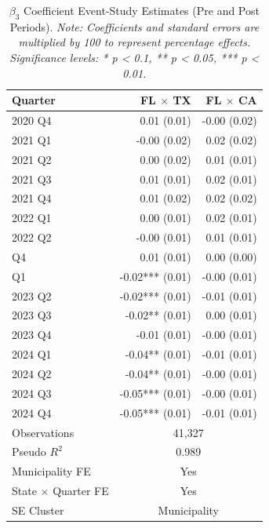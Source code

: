 {\renewcommand{\arraystretch}{1.25}
\setlength{\tabcolsep}{22pt}
\begin{table}

\caption{$\beta_3$ Coefficient Event-Study Estimates (Pre and Post Periods). \textit{Note: Coefficients and standard errors are multiplied by 100 to represent percentage effects. Significance levels: * p < 0.1, ** p < 0.05, *** p < 0.01.} \label{tab:spillovers_tx_ca}}
\centering
\begin{tabular}[t]{lrr}
\toprule
Quarter & FL $\times$ TX & FL $\times$ CA\\
\midrule
2020 Q4 & 0.01\phantom{***} (0.01) & -0.00\phantom{***} (0.02)\\
2021 Q1 & -0.00\phantom{***} (0.02) & 0.02\phantom{***} (0.02)\\
2021 Q2 & 0.00\phantom{***} (0.02) & 0.01\phantom{***} (0.01)\\
2021 Q3 & 0.01\phantom{***} (0.01) & 0.02\phantom{***} (0.01)\\
2021 Q4 & 0.01\phantom{***} (0.02) & 0.02\phantom{***} (0.02)\\
2022 Q1 & 0.00\phantom{***} (0.01) & 0.02\phantom{***} (0.01)\\
2022 Q2 & -0.00\phantom{***} (0.01) & 0.01\phantom{***} (0.01)\\
\addlinespace
2022 Q4 & 0.01\phantom{***} (0.01) & 0.00\phantom{***} (0.00)\\
\addlinespace
2023 Q1 & -0.02*** (0.01) & -0.00\phantom{***} (0.01)\\
2023 Q2 & -0.02*** (0.01) & -0.01\phantom{***} (0.01)\\
2023 Q3 & -0.02**\phantom{*} (0.01) & 0.00\phantom{***} (0.01)\\
2023 Q4 & -0.01\phantom{***} (0.01) & -0.00\phantom{***} (0.01)\\
2024 Q1 & -0.04**\phantom{*} (0.01) & -0.01\phantom{***} (0.01)\\
2024 Q2 & -0.04**\phantom{*} (0.01) & -0.00\phantom{***} (0.01)\\
2024 Q3 & -0.05*** (0.01) & -0.00\phantom{***} (0.01)\\
2024 Q4 & -0.05*** (0.01) & -0.01\phantom{***} (0.01)\\
\midrule
Observations & \multicolumn{2}{c}{41,327} \\
Pseudo $R^2$ & \multicolumn{2}{c}{0.989} \\
Municipality FE & \multicolumn{2}{c}{Yes} \\
State $\times$ Quarter FE & \multicolumn{2}{c}{Yes} \\
SE Cluster & \multicolumn{2}{c}{Municipality} \\
\bottomrule
\end{tabular}
\end{table}
}
